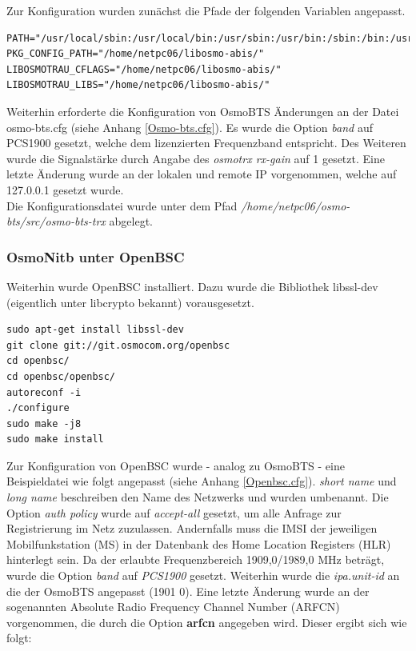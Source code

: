 Zur Konfiguration wurden zunächst die Pfade der folgenden Variablen angepasst.

\begin{lstlisting}
PATH="/usr/local/sbin:/usr/local/bin:/usr/sbin:/usr/bin:/sbin:/bin:/usr/games:/usr/local/games"
PKG_CONFIG_PATH="/home/netpc06/libosmo-abis/"
LIBOSMOTRAU_CFLAGS="/home/netpc06/libosmo-abis/"
LIBOSMOTRAU_LIBS="/home/netpc06/libosmo-abis/"
\end{lstlisting}

Weiterhin erforderte die Konfiguration von OsmoBTS Änderungen an der Datei osmo-bts.cfg (siehe Anhang \ref{Osmo-bts.cfg}). Es wurde die Option \textit{band} auf PCS1900 gesetzt, welche dem lizenzierten Frequenzband entspricht. Des Weiteren wurde    die Signalstärke durch Angabe des \textit{osmotrx rx-gain} auf 1 gesetzt. Eine letzte Änderung wurde an der lokalen und remote IP vorgenommen, welche auf 127.0.0.1 gesetzt wurde. \\

Die Konfigurationsdatei wurde unter dem Pfad \textit{/home/netpc06/osmo-bts/src/osmo-bts-trx} abgelegt. 

\subsubsection{OsmoNitb unter OpenBSC}
Weiterhin wurde OpenBSC installiert. Dazu wurde die Bibliothek libssl-dev (eigentlich unter libcrypto bekannt) vorausgesetzt.

\begin{lstlisting}
sudo apt-get install libssl-dev
git clone git://git.osmocom.org/openbsc
cd openbsc/
cd openbsc/openbsc/
autoreconf -i
./configure 
sudo make -j8
sudo make install
\end{lstlisting}

Zur Konfiguration von OpenBSC wurde - analog zu OsmoBTS - eine Beispieldatei wie folgt angepasst (siehe Anhang \ref{Openbsc.cfg}). \textit{short name} und \textit{long name} beschreiben den Name des Netzwerks und wurden umbenannt. Die Option \textit{auth policy} wurde auf \textit{accept-all} gesetzt, um alle Anfrage zur Registrierung im Netz zuzulassen. Andernfalls muss die IMSI der jeweiligen Mobilfunkstation (MS) in der Datenbank des Home Location Registers (HLR) hinterlegt sein. Da der erlaubte Frequenzbereich 1909,0/1989,0 MHz beträgt, wurde die Option \textit{band} auf \textit{PCS1900} gesetzt. Weiterhin wurde die \textit{ipa.unit-id} an die der OsmoBTS angepasst (1901 0). Eine letzte Änderung wurde an der sogenannten Absolute Radio Frequency Channel Number (ARFCN) vorgenommen, die durch die Option \textbf{arfcn} angegeben wird. Dieser ergibt sich wie folgt:

